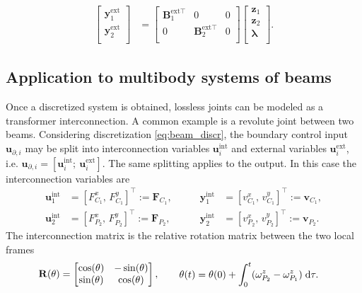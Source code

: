 \documentclass{svjour3}                     %
\begin{document}
\begin{align*}
	\begin{bmatrix}
	\mathbf{y}_1^{\text{ext}} \\ \mathbf{y}_2^{\text{ext}} \\
	\end{bmatrix}  &= \begin{bmatrix}
	\mathbf{B}_1^{\text{ext} \top} & 0 & 0 \\
	0 & \mathbf{B}_2^{\text{ext} \top} & 0 \\
	\end{bmatrix} \begin{bmatrix}
	\mathbf{z}_1 \\ 
	\mathbf{z}_2 \\
	\bm{\lambda} \\
	\end{bmatrix}.
	\end{align*}
	
	
	
	\subsection{Application to multibody systems of beams}
	\label{sec:int_beams}
	Once a discretized system is obtained, lossless joints can be modeled as a transformer interconnection. A common example is a revolute joint between two beams. Considering discretization \eqref{eq:beam_discr}, the boundary control input $\mathbf{u}_{\partial, i}$ may be split into interconnection variables $\mathbf{u}_i^{\text{int}}$ and external variables  $\mathbf{u}_i^{\text{ext}}$, i.e. $\mathbf{u}_{\partial, i} = [\mathbf{u}_i^{\text{int}}; \ \mathbf{u}_i^{\text{ext}}]$. The same splitting applies to the output. In this case the interconnection variables are
	\begin{equation*}
	\begin{aligned}
	\mathbf{u}_1^{\text{int}} &= [F^x_{C_1}, \, F^y_{C_1}]^\top := \mathbf{F}_{C_1}, \\
	\mathbf{u}_2^{\text{int}} &= [F^x_{P_2}, \, F^y_{P_2}]^\top := \mathbf{F}_{P_2},
	\end{aligned} \qquad
	\begin{aligned}
	\mathbf{y}_1^{\text{int}} &= [v^x_{C_1}, \, v^y_{C_1}]^\top := \mathbf{v}_{C_1}, \\
	\mathbf{y}_2^{\text{int}} &= [v^x_{P_2}, \, v^y_{P_2}]^\top := \mathbf{v}_{P_2}.
	\end{aligned}
	\end{equation*}
	The interconnection matrix is the relative rotation matrix between the two local frames
	\begin{equation}
	\mathbf{R}(\theta) = \begin{bmatrix}
	\cos(\theta) & - \sin(\theta) \\
	\sin(\theta) & \cos(\theta) \\
	\end{bmatrix}, \qquad 
	\begin{aligned}
	\theta(t) &= \theta(0) + \int_{0}^t (\omega^z_{P_2} - \omega^z_{P_1}) \d{\tau}.
	\end{aligned}
	\end{equation}
	
\end{document}
